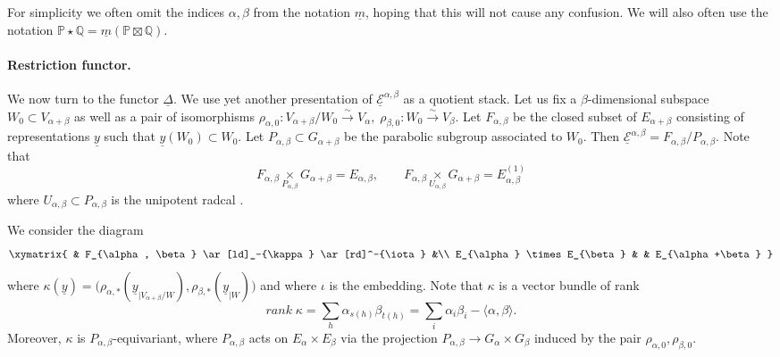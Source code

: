 \documentclass[a4paper,10pt]{amsart}
\def\a{\alpha}
\numberwithin{equation}{section}
\begin{document}
For simplicity we often omit the indices $\alpha,\beta$ from the notation $\underline{m}$, hoping that this will not cause any confusion. We will also often use the notation $\mathbb{P} \star \mathbb{Q}=\underline{m}(\mathbb{P} \boxtimes \mathbb{Q})$.

\vspace{.2in}

\paragraph{\textbf{Restriction functor.}} We now turn to the functor $\underline{\Delta}$.  We use yet another presentation of $\underline{\mathcal{E}}^{\alpha, \beta}$ as a quotient stack. Let us fix a $\beta$-dimensional subspace $W_0 \subset V_{\a+\beta}$ as well as a pair of isomorphisms $\rho_{\alpha,0}: V_{\a+\beta}/W_0 \stackrel{\sim}{\to} V_{\alpha}, \;\rho_{\beta,0}: W_0 \stackrel{\sim}{\to} V_{\beta}$. Let $F_{\alpha,\beta}$ be the closed subset of $E_{\alpha+\beta}$ consisting of representations $\underline{y}$ such that $\underline{y}(W_0) \subset W_0$. Let $P_{\alpha,\beta} \subset G_{\a+\beta}$ be the parabolic subgroup associated to $W_0$. Then $\underline{\mathcal{E}}^{\alpha, \beta} = F_{\alpha,\beta}/P_{\a,\beta}$. Note that
\begin{equation}\label{E:FGP}
F_{\a,\beta} \underset{P_{\a,\beta}}{\times} G_{\a+\beta} = E_{\a,\beta}, \qquad F_{\a,\beta} \underset{U_{\a,\beta}}{\times} G_{\a+\beta} = E^{(1)}_{\a,\beta}
\end{equation}
where $U_{\a,\beta} \subset P_{\a,\beta}$ is the unipotent radcal .

We consider the diagram
\begin{equation}\label{E:17}
\xymatrix{ &  F_{\alpha, \beta} \ar[ld]_-{\kappa} \ar[rd]^-{\iota} &\\
E_{\alpha} \times E_{\beta} & &
E_{\alpha+\beta}
}
\end{equation}
where $\kappa (\underline{y})=\big(\rho_{\alpha,*} (\underline{y}_{|V_{\alpha+\beta}/W}), \rho_{\beta,*}(\underline{y}_{|W})\big)$ and where $\iota$ is the embedding. Note that $\kappa$ is a vector bundle of rank
\begin{equation}\label{E:rankkappa}
rank\;\kappa=\sum_h \alpha_{s(h)} \beta_{t(h)}=\sum_i \a_i \beta_i - \langle \a, \beta \rangle.
\end{equation}
Moreover, $\kappa$ is $P_{\alpha,\beta}$-equivariant, where $P_{\alpha,\beta}$ acts on $E_{\alpha} \times E_{\beta}$ via the projection $P_{\alpha,\beta} \to G_{\alpha} \times G_{\beta}$ induced by the pair $\rho_{\alpha,0}, \rho_{\beta,0}$.
\end{document}
